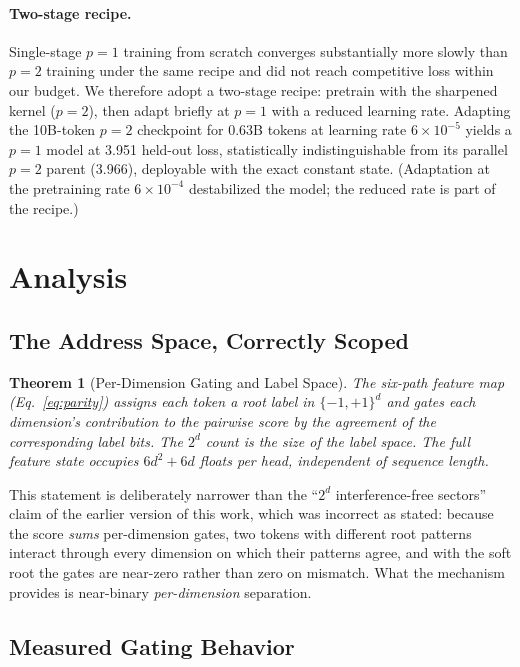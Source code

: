\documentclass{article}
\newtheorem{theorem}{Theorem}
\begin{document}
\paragraph{Two-stage recipe.} Single-stage $p=1$ training from scratch converges substantially more slowly than $p=2$ training under the same recipe and did not reach competitive loss within our budget. We therefore adopt a two-stage recipe: pretrain with the sharpened kernel ($p=2$), then adapt briefly at $p=1$ with a reduced learning rate. Adapting the 10B-token $p=2$ checkpoint for 0.63B tokens at learning rate $6\times10^{-5}$ yields a $p=1$ model at 3.951 held-out loss, statistically indistinguishable from its parallel $p=2$ parent (3.966), deployable with the exact constant state. (Adaptation at the pretraining rate $6\times10^{-4}$ destabilized the model; the reduced rate is part of the recipe.)

\section{Analysis}
\label{sec:analysis}

\subsection{The Address Space, Correctly Scoped}

\begin{theorem}[Per-Dimension Gating and Label Space]
\label{thm:address}
The six-path feature map (Eq.~\ref{eq:parity}) assigns each token a root label in $\{-1,+1\}^d$ and gates each dimension's contribution to the pairwise score by the agreement of the corresponding label bits. The $2^d$ count is the size of the label space. The full feature state occupies $6d^2 + 6d$ floats per head, independent of sequence length.
\end{theorem}

This statement is deliberately narrower than the ``$2^d$ interference-free sectors'' claim of the earlier version of this work, which was incorrect as stated: because the score \emph{sums} per-dimension gates, two tokens with different root patterns interact through every dimension on which their patterns agree, and with the soft root the gates are near-zero rather than zero on mismatch. What the mechanism provides is near-binary \emph{per-dimension} separation.

\subsection{Measured Gating Behavior}
\label{sec:gating-measured}
\end{document}
